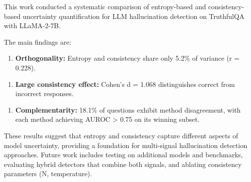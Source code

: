
This work conducted a systematic comparison of entropy-based and consistency-based uncertainty quantification for LLM hallucination detection on TruthfulQA with LLaMA-2-7B.

The main findings are:

\begin{enumerate}
\item \textbf{Orthogonality:} Entropy and consistency share only 5.2\% of variance (r = 0.228).
\end{enumerate}

\begin{enumerate}
\item \textbf{Large consistency effect:} Cohen's d = 1.068 distinguishes correct from incorrect responses.
\end{enumerate}

\begin{enumerate}
\item \textbf{Complementarity:} 18.1\% of questions exhibit method disagreement, with each method achieving AUROC > 0.75 on its winning subset.
\end{enumerate}

These results suggest that entropy and consistency capture different aspects of model uncertainty, providing a foundation for multi-signal hallucination detection approaches. Future work includes testing on additional models and benchmarks, evaluating hybrid detectors that combine both signals, and ablating consistency parameters (N, temperature).

